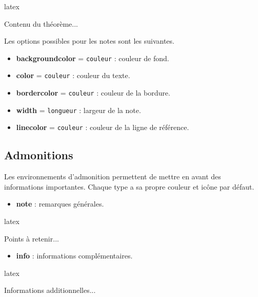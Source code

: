 \documentclass[
    french,
    margin=2cm
]{neoschool}
\begin{document}
\begin{code}{latex}
\begin{theorem}
    \tdmark[thm1]  %
    Contenu du théorème...
\end{theorem}
\end{code}

Les options possibles pour les notes sont les suivantes.

\begin{itemize}
\item \textbf{backgroundcolor} = \texttt{couleur} : couleur
  de fond.
\item \textbf{color} = \texttt{couleur} : couleur du texte.
\item \textbf{bordercolor} = \texttt{couleur} : couleur de
  la bordure.
\item \textbf{width} = \texttt{longueur} : largeur de la
  note.
\item \textbf{linecolor} = \texttt{couleur} : couleur de la
  ligne de référence.
\end{itemize}

\subsection{Admonitions}

Les environnements d'admonition permettent de mettre en avant des
informations importantes. Chaque type a sa propre couleur et icône par
défaut.

\begin{itemize}
\item \textbf{note} : remarques générales.
\end{itemize}

\begin{code}{latex}
\begin{note}
    Points à retenir...
\end{note}
\end{code}

\begin{itemize}
\item \textbf{info} : informations complémentaires.
\end{itemize}

\begin{code}{latex}
\begin{info}
    Informations additionnelles...
\end{info}
\end{code}
\end{document}
